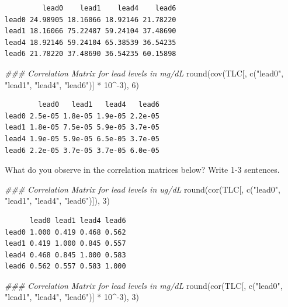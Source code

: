 \documentclass[
  letterpaper,
  DIV=11,
  numbers=noendperiod]{scrreprt}
\newenvironment{Shaded}{\begin{snugshade}}{\end{snugshade}}
\newcommand{\DecValTok}[1]{\textcolor[rgb]{0.68,0.00,0.00}{#1}}
\newcommand{\DocumentationTok}[1]{\textcolor[rgb]{0.37,0.37,0.37}{\textit{#1}}}
\newcommand{\FunctionTok}[1]{\textcolor[rgb]{0.28,0.35,0.67}{#1}}
\newcommand{\NormalTok}[1]{\textcolor[rgb]{0.00,0.23,0.31}{#1}}
\newcommand{\SpecialCharTok}[1]{\textcolor[rgb]{0.37,0.37,0.37}{#1}}
\newcommand{\StringTok}[1]{\textcolor[rgb]{0.13,0.47,0.30}{#1}}
\begin{document}
\begin{verbatim}
         lead0    lead1    lead4    lead6
lead0 24.98905 18.16066 18.92146 21.78220
lead1 18.16066 75.22487 59.24104 37.48690
lead4 18.92146 59.24104 65.38539 36.54235
lead6 21.78220 37.48690 36.54235 60.15898
\end{verbatim}

\begin{Shaded}
\begin{Highlighting}[]
\DocumentationTok{\#\#\# Correlation Matrix for lead levels in mg/dL}
\FunctionTok{round}\NormalTok{(}\FunctionTok{cov}\NormalTok{(TLC[, }\FunctionTok{c}\NormalTok{(}\StringTok{"lead0"}\NormalTok{, }\StringTok{"lead1"}\NormalTok{, }\StringTok{"lead4"}\NormalTok{, }\StringTok{"lead6"}\NormalTok{)] }\SpecialCharTok{*} \DecValTok{10}\SpecialCharTok{\^{}{-}}\DecValTok{3}\NormalTok{), }\DecValTok{6}\NormalTok{)}
\end{Highlighting}
\end{Shaded}

\begin{verbatim}
        lead0   lead1   lead4   lead6
lead0 2.5e-05 1.8e-05 1.9e-05 2.2e-05
lead1 1.8e-05 7.5e-05 5.9e-05 3.7e-05
lead4 1.9e-05 5.9e-05 6.5e-05 3.7e-05
lead6 2.2e-05 3.7e-05 3.7e-05 6.0e-05
\end{verbatim}

What do you observe in the correlation matrices below? Write 1-3
sentences.

\begin{Shaded}
\begin{Highlighting}[]
\DocumentationTok{\#\#\# Correlation Matrix for lead levels in ug/dL}
\FunctionTok{round}\NormalTok{(}\FunctionTok{cor}\NormalTok{(TLC[, }\FunctionTok{c}\NormalTok{(}\StringTok{"lead0"}\NormalTok{, }\StringTok{"lead1"}\NormalTok{, }\StringTok{"lead4"}\NormalTok{, }\StringTok{"lead6"}\NormalTok{)]), }\DecValTok{3}\NormalTok{)}
\end{Highlighting}
\end{Shaded}

\begin{verbatim}
      lead0 lead1 lead4 lead6
lead0 1.000 0.419 0.468 0.562
lead1 0.419 1.000 0.845 0.557
lead4 0.468 0.845 1.000 0.583
lead6 0.562 0.557 0.583 1.000
\end{verbatim}

\begin{Shaded}
\begin{Highlighting}[]
\DocumentationTok{\#\#\# Correlation Matrix for lead levels in mg/dL}
\FunctionTok{round}\NormalTok{(}\FunctionTok{cor}\NormalTok{(TLC[, }\FunctionTok{c}\NormalTok{(}\StringTok{"lead0"}\NormalTok{, }\StringTok{"lead1"}\NormalTok{, }\StringTok{"lead4"}\NormalTok{, }\StringTok{"lead6"}\NormalTok{)] }\SpecialCharTok{*} \DecValTok{10}\SpecialCharTok{\^{}{-}}\DecValTok{3}\NormalTok{), }\DecValTok{3}\NormalTok{)}
\end{Highlighting}
\end{Shaded}
\end{document}
